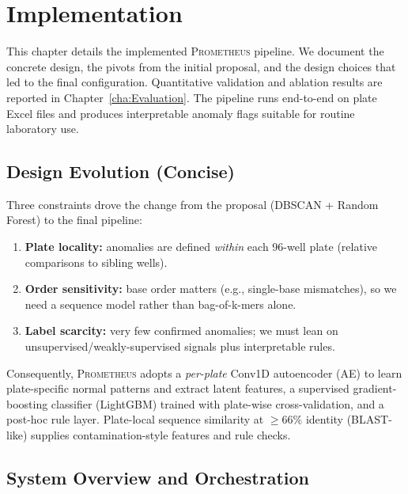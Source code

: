 
%

\chapter{Implementation}
\label{cha:Implementation}

This chapter details the implemented \textsc{Prometheus} pipeline. We document the concrete design, the pivots from the initial proposal, and the design choices that led to the final configuration. Quantitative validation and ablation results are reported in Chapter~\ref{cha:Evaluation}. The pipeline runs end-to-end on plate Excel files and produces interpretable anomaly flags suitable for routine laboratory use.

\section{Design Evolution (Concise)}
\label{sec:impl_evolution}
Three constraints drove the change from the proposal (DBSCAN + Random Forest) to the final pipeline:
\begin{enumerate}
  \item \textbf{Plate locality:} anomalies are defined \emph{within} each 96-well plate (relative comparisons to sibling wells).
  \item \textbf{Order sensitivity:} base order matters (e.g., single-base mismatches), so we need a sequence model rather than bag-of-k-mers alone.
  \item \textbf{Label scarcity:} very few confirmed anomalies; we must lean on unsupervised/weakly-supervised signals plus interpretable rules.
\end{enumerate}
Consequently, \textsc{Prometheus} adopts a \emph{per-plate} Conv1D autoencoder (AE) to learn plate-specific normal patterns and extract latent features, a supervised gradient-boosting classifier (LightGBM) trained with plate-wise cross-validation, and a post-hoc rule layer. Plate-local sequence similarity at $\geq 66\%$ identity (BLAST-like) supplies contamination-style features and rule checks.

\section{System Overview and Orchestration}
\label{sec:system_overview}

